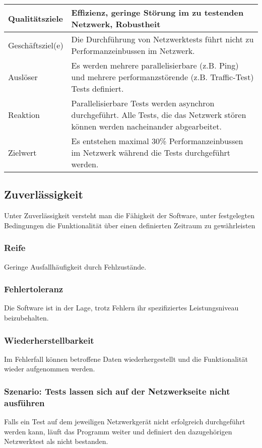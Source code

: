 \documentclass[
	ngerman,
	toc=listof, %
	toc=bibliography, %
	footnotes=multiple, %
	parskip=half, %
	numbers=noendperiod %
]{scrartcl}
\begin{document}
		\begin{tabularx}{\textwidth}{lX}
			\toprule
			Qualitätsziele & Effizienz, geringe Störung im zu testenden Netzwerk, Robustheit  \\
			\midrule
			Geschäftsziel(e) & Die Durchführung von Netzwerktests führt nicht zu Performanzeinbussen im Netzwerk.  \\
			\midrule
			Auslöser & Es werden mehrere parallelisierbare (z.B. Ping) und mehrere performanzstörende (z.B. Traffic-Test) Tests definiert.  \\
			\midrule
			Reaktion & Parallelisierbare Tests werden asynchron durchgeführt. Alle Tests, die das Netzwerk stören können werden nacheinander abgearbeitet. \\
			\midrule
			Zielwert & Es entstehen maximal 30\% Performanzeinbussen im Netzwerk während die Tests durchgeführt werden.  \\
			\bottomrule
		\end{tabularx}

	\subsection{Zuverlässigkeit}
	Unter Zuverlässigkeit versteht man die Fähigkeit der Software, unter festgelegten Bedingungen die Funktionalität über einen definierten Zeitraum zu gewährleisten
	
		\subsubsection{Reife}
		Geringe Ausfallhäufigkeit durch Fehlzustände.

		\subsubsection{Fehlertoleranz}
		Die Software ist in der Lage, trotz Fehlern ihr spezifiziertes Leistungsniveau beizubehalten.

		\subsubsection{Wiederherstellbarkeit}
		Im Fehlerfall können betroffene Daten wiederhergestellt und die Funktionalität wieder aufgenommen werden.

		\subsubsection{Szenario: Tests lassen sich auf der Netzwerkseite nicht ausführen}
		Falls ein Test auf dem jeweiligen Netzwerkgerät nicht erfolgreich durchgeführt werden kann, läuft das Programm weiter und definiert den dazugehörigen Netzwerktest als nicht bestanden.
		
\end{document}

